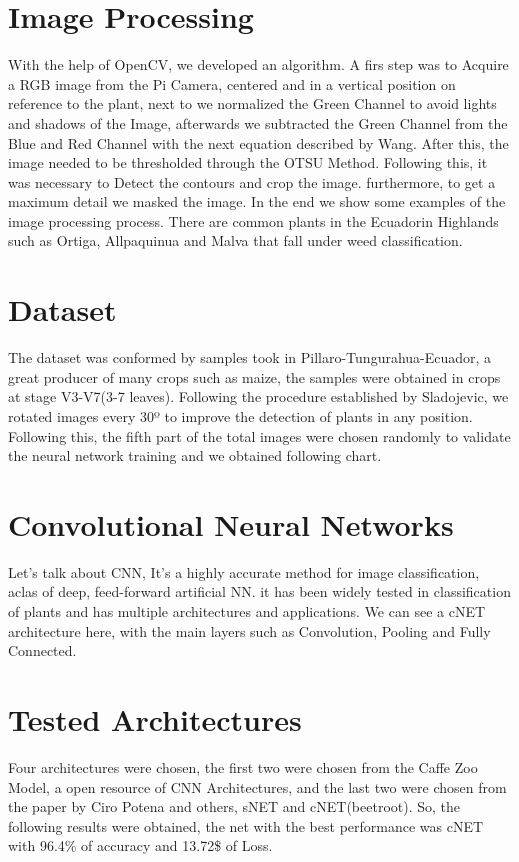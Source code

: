 \documentclass[10pt,a4paper]{proc}
\begin{document}
\section{Image Processing}
With the help of OpenCV, we developed an algorithm. A firs step was to Acquire a RGB image from the Pi Camera, centered and in a vertical position on reference to the plant, next to we normalized the Green Channel to avoid lights and shadows of the Image, afterwards we subtracted the Green Channel from the Blue and Red Channel with the next equation described by Wang. After this, the image needed to be thresholded through the OTSU Method. Following this, it was necessary to Detect the contours and crop the image. furthermore, to get a maximum detail we masked the image. In the end we show some examples of the image processing process. There are common plants in the Ecuadorin Highlands such as Ortiga, Allpaquinua and Malva that fall under weed classification.
\section{Dataset}
The dataset was conformed by samples took in Pillaro-Tungurahua-Ecuador, a great producer of many crops such as maize, the samples were obtained in crops at stage V3-V7(3-7 leaves). Following the procedure established by Sladojevic, we rotated images every 30º to improve the detection of plants in any position. Following this, the fifth part of the total images were chosen randomly to validate the neural network training and we obtained following chart. 
\section{Convolutional Neural Networks}
Let's talk about CNN, It's a highly accurate method for image classification, aclas of deep, feed-forward artificial NN. it has been widely tested in classification of plants and has multiple architectures and applications. We  can see a cNET architecture here, with the main layers such as Convolution, Pooling and Fully Connected.
\section{Tested Architectures}
Four architectures were chosen, the first two were chosen from the Caffe Zoo Model, a open resource of CNN Architectures, and the last two were chosen from the paper by Ciro Potena and others, sNET and cNET(beetroot). So, the following results were obtained, the net with the best performance was cNET with 96.4\% of accuracy and 13.72\$ of Loss. 
\end{document}
